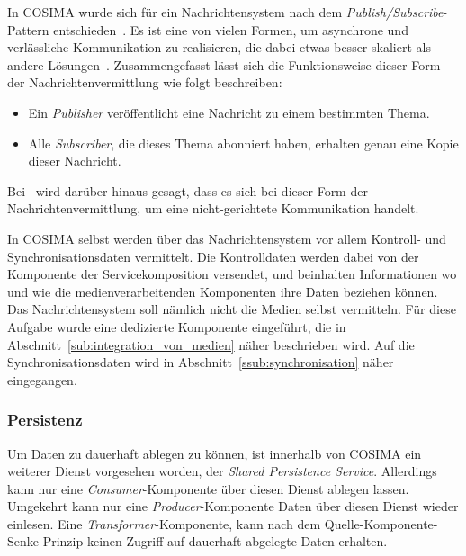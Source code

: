   In COSIMA wurde sich für ein Nachrichtensystem nach dem \emph{Publish/Subscribe}-Pattern entschieden~\citep[S. 106]{enterprise_integration_patterns}. Es ist eine von vielen Formen, um asynchrone und verlässliche Kommunikation zu realisieren, die dabei etwas besser skaliert als andere Lösungen~\citep[S. 69]{web_services_principles_and_technology}. Zusammengefasst lässt sich die Funktionsweise dieser Form der Nachrichtenvermittlung wie folgt beschreiben:
  
  \begin{itemize}
    \item Ein \emph{Publisher} veröffentlicht eine Nachricht zu einem bestimmten Thema.
    \item Alle \emph{Subscriber}, die dieses Thema abonniert haben, erhalten genau eine Kopie dieser Nachricht.
  \end{itemize}
  
  Bei~\citep[S. 127]{soa_goes_real} wird darüber hinaus gesagt, dass es sich bei dieser Form der Nachrichtenvermittlung, um eine nicht-gerichtete Kommunikation handelt.
  
  In COSIMA selbst werden über das Nachrichtensystem vor allem Kontroll- und Synchronisationsdaten vermittelt. Die Kontrolldaten werden dabei von der Komponente der Servicekomposition versendet, und beinhalten Informationen wo und wie die medienverarbeitenden Komponenten ihre Daten beziehen können. Das Nachrichtensystem soll nämlich nicht die Medien selbst vermitteln. Für diese Aufgabe wurde eine dedizierte Komponente eingeführt, die in Abschnitt~\ref{sub:integration_von_medien} näher beschrieben wird. Auf die Synchronisationsdaten wird in Abschnitt~\ref{ssub:synchronisation} näher eingegangen.
  

\subsubsection{Persistenz} %
\label{ssub:persistenz}

  Um Daten zu dauerhaft ablegen zu können, ist innerhalb von COSIMA ein weiterer Dienst vorgesehen worden, der \emph{Shared Persistence Service}. Allerdings kann nur eine \emph{Consumer}-Komponente über diesen Dienst ablegen lassen. Umgekehrt kann nur eine \emph{Producer}-Komponente Daten über diesen Dienst wieder einlesen. Eine \emph{Transformer}-Komponente, kann nach dem Quelle-Komponente-Senke Prinzip keinen Zugriff auf dauerhaft abgelegte Daten erhalten.
  
